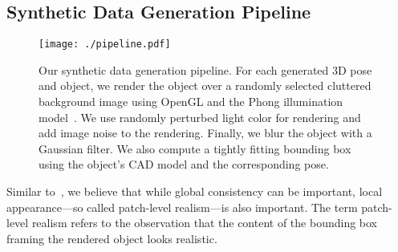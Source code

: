 \documentclass[10pt,twocolumn,letterpaper]{article}
\begin{document}
\subsection{Synthetic Data Generation Pipeline}
\label{lab:synthetic_data_generation}

\begin{figure*}[ht]
\begin{center}
\texttt{[image: ./pipeline.pdf]} 
\end{center}
\caption{\label{fig:pipeline} Our synthetic data  generation pipeline.  For each
  generated 3D  pose and object, we  render the object over  a randomly selected
  cluttered   background  image   using  OpenGL   and  the   Phong  illumination
  model~\cite{Phong75}.  We use randomly perturbed light color for rendering and
  add image noise to the rendering.  Finally, we blur the object with a Gaussian
  filter. We also compute a tightly  fitting bounding box using the object's CAD
  model and the corresponding pose.}

\end{figure*}


Similar to~\cite{Dwibedi17},  we believe  that while  global consistency  can be
important, local appearance---so called patch-level realism---is also important.
The term patch-level  realism refers to the observation that  the content of the
bounding box framing the rendered object  looks realistic.
\end{document}
